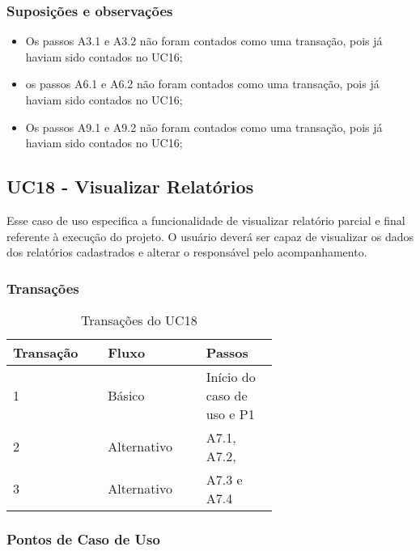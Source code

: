   \subsubsection{Suposições e observações}
  
  \begin{itemize}
   \item Os passos A3.1 e A3.2 não foram contados como uma transação, pois já haviam sido contados no UC16;	
   \item os passos A6.1 e A6.2 não foram contados como uma transação, pois já haviam sido contados no UC16;	
   \item Os passos A9.1 e A9.2 não foram contados como uma transação, pois já haviam sido contados no UC16;
  \end{itemize}
  
  \vfill
  
  
  
  \pagebreak
\subsection{UC18 - Visualizar Relatórios}
  
  Esse caso de uso especifica a funcionalidade de visualizar relatório parcial e final referente à execução do projeto.
  O usuário deverá ser capaz de visualizar os dados dos relatórios cadastrados e alterar o responsável pelo acompanhamento.

  \subsubsection{Transações}

  \begin{table*}[!h]
  \centering
  \caption{Transações do UC18}
  \label{uc17_transactions}
    \begin{tabular}{|p{0.20\linewidth}|p{0.25\linewidth}|p{0.20\linewidth}|}
    \hline
    \textbf{Transação} & \textbf{Fluxo} & \textbf{Passos} \\ 
    \hline
    1 & Básico & Início do caso de uso e P1\\
    \hline
    2 & Alternativo & A7.1, A7.2, \\
    \hline
    3 & Alternativo & A7.3 e A7.4\\
    \hline
    \end{tabular}
  \end{table*}

  \subsubsection{Pontos de Caso de Uso}

